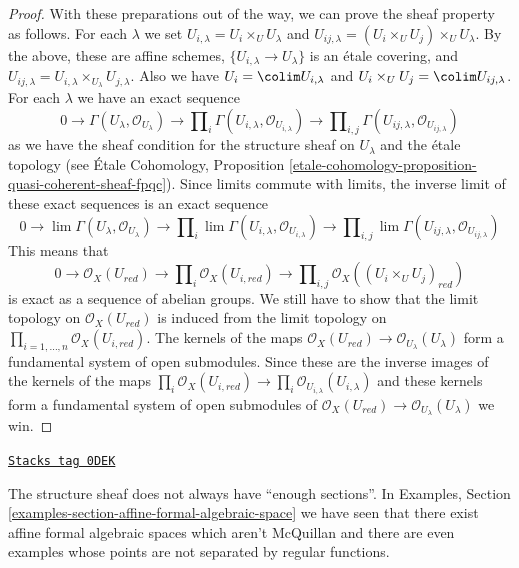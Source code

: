 \begin{proof}
\medskip\noindent
With these preparations out of the way, we can prove the sheaf
property as follows. For each $\lambda$ we set
$U_{i, \lambda} = U_i \times_U U_\lambda$ and
$U_{ij, \lambda} = (U_i \times_U U_j) \times_U U_\lambda$.
By the above, these are affine schemes, $\{U_{i, \lambda} \to U_\lambda\}$
is an \'etale covering, and
$U_{ij, \lambda} = U_{i, \lambda} \times_{U_\lambda} U_{j, \lambda}$.
Also we have $U_i = \colim U_{i, \lambda}$ and
$U_i \times_U U_j = \colim U_{ij, \lambda}$.
For each $\lambda$ we have an exact sequence
$$
0 \to
\Gamma(U_\lambda, \mathcal{O}_{U_\lambda}) \to
\prod\nolimits_i \Gamma(U_{i, \lambda}, \mathcal{O}_{U_{i, \lambda}}) \to
\prod\nolimits_{i, j} \Gamma(U_{ij, \lambda}, \mathcal{O}_{U_{ij, \lambda}})
$$
as we have the sheaf condition for the structure sheaf
on $U_\lambda$ and the \'etale topology
(see \'Etale Cohomology, Proposition
\ref{etale-cohomology-proposition-quasi-coherent-sheaf-fpqc}).
Since limits commute with limits, the inverse limit of these
exact sequences is an exact sequence
$$
0 \to
\lim \Gamma(U_\lambda, \mathcal{O}_{U_\lambda}) \to
\prod\nolimits_i \lim \Gamma(U_{i, \lambda}, \mathcal{O}_{U_{i, \lambda}}) \to
\prod\nolimits_{i, j} \lim
\Gamma(U_{ij, \lambda}, \mathcal{O}_{U_{ij, \lambda}})
$$
This means that
$$
0 \to
\mathcal{O}_X(U_{red}) \to
\prod\nolimits_i \mathcal{O}_X(U_{i, red}) \to
\prod\nolimits_{i, j} \mathcal{O}_X((U_i \times_U U_j)_{red})
$$
is exact as a sequence of abelian groups. We still have to
show that the limit topology on $\mathcal{O}_X(U_{red})$ is induced
from the limit topology on
$\prod_{i = 1, \ldots, n} \mathcal{O}_X(U_{i, red})$.
The kernels of the maps
$\mathcal{O}_X(U_{red}) \to \mathcal{O}_{U_\lambda}(U_\lambda)$
form a fundamental system of open submodules. Since these are the inverse
images of the kernels of the maps
$\prod_i \mathcal{O}_X(U_{i, red}) \to
\prod_i \mathcal{O}_{U_{i, \lambda}}(U_{i, \lambda})$
and these kernels form a fundamental system of open submodules
of $\mathcal{O}_X(U_{red}) \to \mathcal{O}_{U_\lambda}(U_\lambda)$
we win.
\end{proof}

\begin{remark}
\label{formal-spaces-remark-not-enough-sections}
\href{https://stacks.math.columbia.edu/tag/0DEK}{\texttt{Stacks tag 0DEK}}

The structure sheaf does not always have ``enough sections''.
In Examples, Section \ref{examples-section-affine-formal-algebraic-space}
we have seen that there exist affine formal algebraic spaces which
aren't McQuillan and there are even examples whose points are not
separated by regular functions.
\end{remark}

